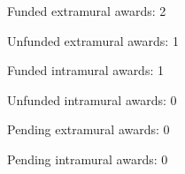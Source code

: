 \begin{veryTightItemize}
    \item Funded extramural awards: 2
    \item Unfunded extramural awards: 1
    \item Funded intramural awards: 1
    \item Unfunded intramural awards: 0
    \item Pending extramural awards: 0
    \item Pending intramural awards: 0
\end{veryTightItemize}

